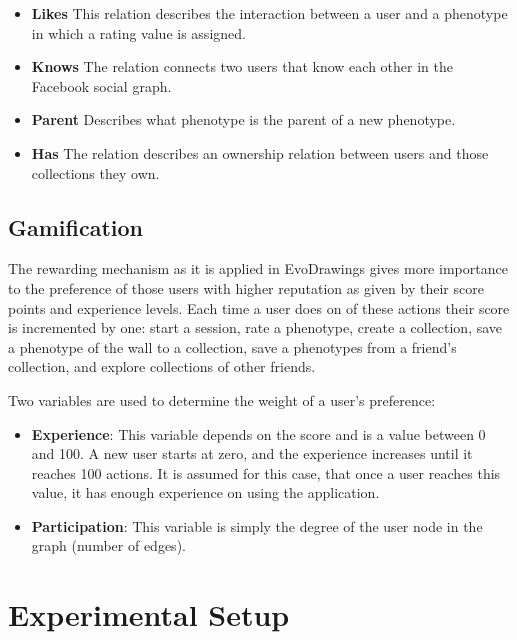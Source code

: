 \begin{itemize}
\item {\bf Likes} This relation describes the interaction between a user and
a phenotype in which a rating value is assigned.

\item {\bf Knows} The relation connects two users that know each
other in the Facebook social graph. 

\item {\bf Parent} Describes what phenotype is the parent of a new
  phenotype. 

\item {\bf Has} The relation describes an ownership relation between users and
those collections they own. 
\end{itemize}

\subsection{Gamification}
The rewarding mechanism as it is applied in EvoDrawings gives more importance 
to the preference of those users with higher reputation
as given by their score points and experience levels.  
Each time a user does on of these actions their score is incremented by one:
start a session, rate a phenotype, create a collection, save a phenotype of 
the wall to a collection, save a phenotypes from a friend's collection, and
explore collections of other friends.

Two variables are used to determine the weight of a user's preference:
\begin{itemize}
\item {\bf Experience}: This variable depends on the score and is a value 
between 0 and 100. A new user starts at zero, and the experience increases until
it reaches 100 actions. It is assumed for this case, that once a user
reaches this value, it has enough experience on using the
application. %
\item {\bf Participation}: This variable is simply the degree of the user node 
in the graph (number of edges).    
\end{itemize}

\section{Experimental Setup}
\label{sec:experiment}

